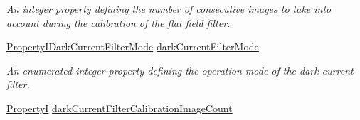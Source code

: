 \begin{DoxyCompactItemize}
\begin{DoxyCompactList}\small\item\em An integer property defining the number of consecutive images to take into account during the calibration of the flat field filter. \end{DoxyCompactList}\item 
\hyperlink{group___common_interface_gade29cf3422c28d48e5d6c20cd9f47f1e}{Property\+I\+Dark\+Current\+Filter\+Mode} \hyperlink{classmv_i_m_p_a_c_t_1_1acquire_1_1_image_processing_a86a24af86e5db2dd3efc249ef1db69eb}{dark\+Current\+Filter\+Mode}
\begin{DoxyCompactList}\small\item\em An enumerated integer property defining the operation mode of the dark current filter. \end{DoxyCompactList}\item 
\hypertarget{classmv_i_m_p_a_c_t_1_1acquire_1_1_image_processing_ad26adb6841d7a08858b824b3a846bbcf}{\hyperlink{group___common_interface_ga12d5e434238ca242a1ba4c6c3ea45780}{Property\+I} \hyperlink{classmv_i_m_p_a_c_t_1_1acquire_1_1_image_processing_ad26adb6841d7a08858b824b3a846bbcf}{dark\+Current\+Filter\+Calibration\+Image\+Count}}\label{classmv_i_m_p_a_c_t_1_1acquire_1_1_image_processing_ad26adb6841d7a08858b824b3a846bbcf}


\end{DoxyCompactItemize}

